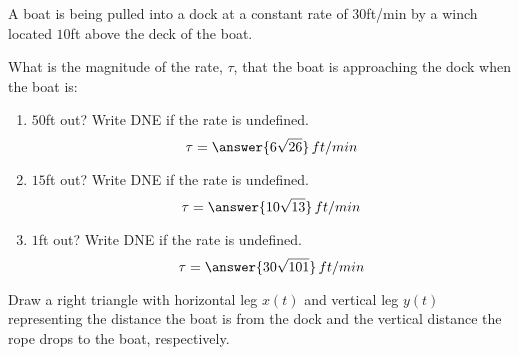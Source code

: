 \documentclass{ximera}
\author{Gregory Hartman \and Matthew Carr}
\begin{document}
\begin{exercise}



A boat is being pulled into a dock at a constant rate of $30$ft/min by a winch located $10$ft above the deck of the boat.

What is the magnitude of the rate, $\tau$, that the boat is approaching the dock when the boat is:
\begin{enumerate}
\item		$50$ft out? Write DNE if the rate is undefined. \[\tau=\answer{6\sqrt{26}}\,ft/min\]
\item		$15$ft out? Write DNE if the rate is undefined.
 \[\tau=\answer{10\sqrt{13}}\,ft/min\]
\item		$1$ft out? Write DNE if the rate is undefined. \[\tau=\answer{30\sqrt{101}}\,ft/min\]
\end{enumerate}

\begin{hint}
Draw a right triangle with horizontal leg $x(t)$ and vertical leg $y(t)$ representing the distance the boat is from the dock and the vertical distance the rope drops to the boat, respectively.
\end{hint}

\end{exercise}
\end{document}
